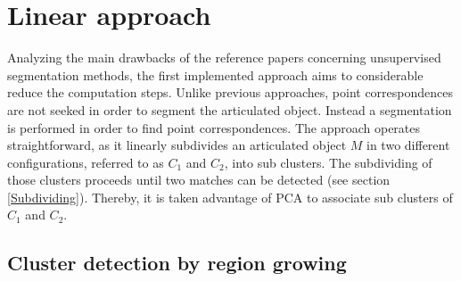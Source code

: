 \chapter{Linear approach}
\label{cha:LinearApproach}

Analyzing the main drawbacks of the reference papers concerning unsupervised segmentation methods, the first implemented approach aims to considerable reduce the computation steps. Unlike previous approaches, point correspondences are not seeked in order to segment the articulated object. Instead a segmentation is performed in order to find point correspondences. The approach operates straightforward, as it linearly subdivides an articulated object $M$ in two different configurations, referred to as $C_1$ and $C_2$, into sub clusters. The subdividing of those clusters proceeds until two matches can be detected (see section \ref{Subdividing}). Thereby, it is taken advantage of PCA to associate sub clusters of $C_1$ and $C_2$.

\section{Cluster detection by region growing}
\label{clustering}

